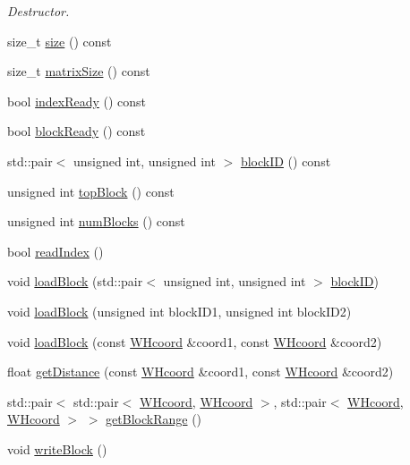 \begin{DoxyCompactItemize}
\begin{DoxyCompactList}\small\item\em \-Destructor. \end{DoxyCompactList}\item 
size\-\_\-t \hyperlink{classdistBlock_a73f05587a7c24c5633e8bac059c0bb07}{size} () const 
\item 
size\-\_\-t \hyperlink{classdistBlock_aad774a985739628972fae49bc115a76d}{matrix\-Size} () const 
\item 
bool \hyperlink{classdistBlock_ae03172d6b52b60af55e54c5622eb91da}{index\-Ready} () const 
\item 
bool \hyperlink{classdistBlock_abd37aefd274a43beab4e51eb024cf0c1}{block\-Ready} () const 
\item 
std\-::pair$<$ unsigned int, \*
unsigned int $>$ \hyperlink{classdistBlock_acba9b8b8807f0759e34845290410bc3a}{block\-I\-D} () const 
\item 
unsigned int \hyperlink{classdistBlock_afe2d0f75073eb4fbb4ee4d8b8882018c}{top\-Block} () const 
\item 
unsigned int \hyperlink{classdistBlock_ac0a69284e141cda9a7fe7319b8aea9ad}{num\-Blocks} () const 
\item 
bool \hyperlink{classdistBlock_ab318e34fc358d76128db4aed07348ace}{read\-Index} ()
\item 
void \hyperlink{classdistBlock_a9a06bef34c8519e94e85d11d55c12859}{load\-Block} (std\-::pair$<$ unsigned int, unsigned int $>$ \hyperlink{classdistBlock_acba9b8b8807f0759e34845290410bc3a}{block\-I\-D})
\item 
void \hyperlink{classdistBlock_a580cc4324c8a4746d268dcc34267e46f}{load\-Block} (unsigned int block\-I\-D1, unsigned int block\-I\-D2)
\item 
void \hyperlink{classdistBlock_a39b2f77c593d441c707563a0e7b48794}{load\-Block} (const \hyperlink{classWHcoord}{\-W\-Hcoord} \&coord1, const \hyperlink{classWHcoord}{\-W\-Hcoord} \&coord2)
\item 
float \hyperlink{classdistBlock_a92c2104dbc9f43b11152711fb93822cb}{get\-Distance} (const \hyperlink{classWHcoord}{\-W\-Hcoord} \&coord1, const \hyperlink{classWHcoord}{\-W\-Hcoord} \&coord2)
\item 
std\-::pair$<$ std\-::pair$<$ \hyperlink{classWHcoord}{\-W\-Hcoord}, \*
\hyperlink{classWHcoord}{\-W\-Hcoord} $>$, std\-::pair$<$ \hyperlink{classWHcoord}{\-W\-Hcoord}, \*
\hyperlink{classWHcoord}{\-W\-Hcoord} $>$ $>$ \hyperlink{classdistBlock_a946a3790a0a7a721b51ea8e5c367ab69}{get\-Block\-Range} ()
\item 
void \hyperlink{classdistBlock_a1acd41a20026c5043f22cf4fd0f25f46}{write\-Block} ()
\end{DoxyCompactItemize}
